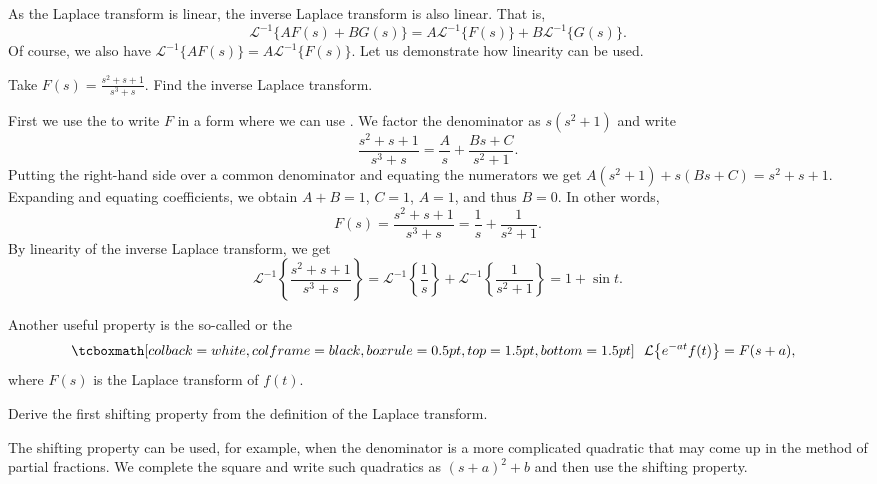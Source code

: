 As the Laplace transform is linear, the inverse Laplace
transform is also linear.  That is,
\begin{equation*}
{\mathcal{L}}^{-1} \bigl\{ A F(s) + B G(s) \bigr\} =
A {\mathcal{L}}^{-1} \bigl\{ F(s) \bigr\} +
B {\mathcal{L}}^{-1} \bigl\{ G(s) \bigr\} .
\end{equation*}
Of course, we also have
${\mathcal{L}}^{-1} \bigl\{ A F(s) \bigr\} =
A {\mathcal{L}}^{-1} \bigl\{ F(s) \bigr\}$.
Let us demonstrate how linearity can be used.

\begin{example}
Take
$F(s) = \frac{s^2+s+1}{s^3+s}$.  Find the inverse Laplace transform.

First we use the \emph{} to write $F$ in a form where
we can use .  We factor the denominator as
$s(s^2+1)$ and write
\begin{equation*}
\frac{s^2+s+1}{s^3+s}
=
\frac{A}{s} + 
\frac{Bs+C}{s^2+1} .
\end{equation*}
Putting the right-hand side over a common
denominator and equating the numerators we get
$A(s^2+1) + s(Bs+C) = s^2+s+1$.  Expanding and equating coefficients,
we obtain $A+B = 1$, $C=1$, $A=1$,
and thus $B=0$.  In
other words,
\begin{equation*}
F(s) =
\frac{s^2+s+1}{s^3+s}
=
\frac{1}{s} +
\frac{1}{s^2+1} .
\end{equation*}
By linearity of the inverse Laplace transform, we get 
\begin{equation*}
{\mathcal{L}}^{-1} \left\{ 
\frac{s^2+s+1}{s^3+s} \right\}
=
{\mathcal{L}}^{-1} \left\{ 
\frac{1}{s} \right\} 
+
{\mathcal{L}}^{-1} \left\{ 
\frac{1}{s^2+1} \right\}
=
1 + 
\sin t .
\end{equation*}
\end{example}

Another useful property is the 
so-called \emph{} or
the \emph{}
\begin{equation*}
\mybxbg{~~
\mathcal{L} \bigl\{ e^{-at} f(t) \bigr\} = F(s+a) ,
~~}
\end{equation*}
where $F(s)$ is the Laplace transform of $f(t)$.

\begin{exercise}
Derive the first shifting property
from the definition of the Laplace transform.
\end{exercise}

The shifting property can be used, for example, when the denominator is a
more complicated quadratic that may come up in the method of partial
fractions.  We complete the square and write such quadratics as ${(s+a)}^2+b$
and then use the shifting property.

